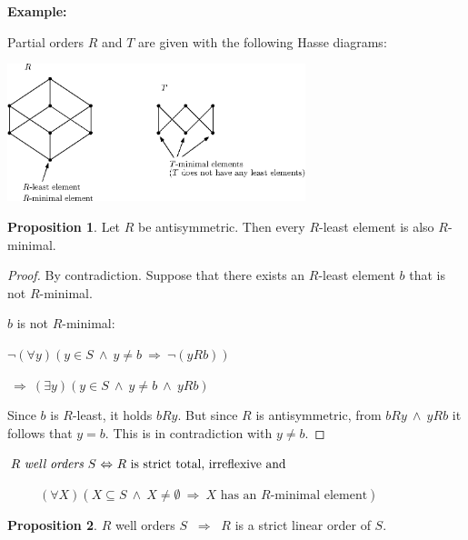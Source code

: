 \documentclass[11pt,paper=b5,footinclude,headinclude]{scrbook} %
\def\inn {{~\wedge~}}
\def\sledi {{~\Rightarrow~}}
\def\cee {{~\Leftrightarrow~}}
\theoremstyle{remark}
\theoremstyle{definition} %
\theoremstyle{theorem} %
\newtheorem*{proposition}{Proposition}
\begin{document}
\bigskip
\newpage
\textbf{ Example:}

Partial orders $R$ and $T$ are given with the following Hasse diagrams:

\begin{center}
\includegraphics[height=40mm]{Hasse2-en.eps}
\end{center}

\medskip

\begin{proposition}
Let $R$ be antisymmetric. Then every $R$-least element is also $R$-minimal.
\end{proposition}

\begin{proof}
By contradiction. Suppose that there exists an $R$-least element $b$ that is not
$R$-minimal.

$b$ is not $R$-minimal:

$\neg(\forall y)(y\in S\inn y\neq b\sledi \neg (yRb))$

$\sledi(\exists y)(y\in S\inn y\neq b\inn yRb)$

Since $b$ is $R$-least, it holds $bRy$. But since $R$ is antisymmetric, from  $bRy\inn yRb$ it follows that $y = b$.
This is in contradiction with $y \neq b$.
\end{proof}


$R \textrm{ {\em well orders }} S \cee R \textrm{ is strict total, irreflexive and }$

~~~~~$(\forall X)(X\subseteq S\inn X\neq\emptyset\sledi X \textrm{ has an $R$-minimal element})$

\begin{proposition}
$R$ well orders $S$ $\sledi$ $R$ is a strict linear order of $S$.
\end{proposition}
\end{document}
